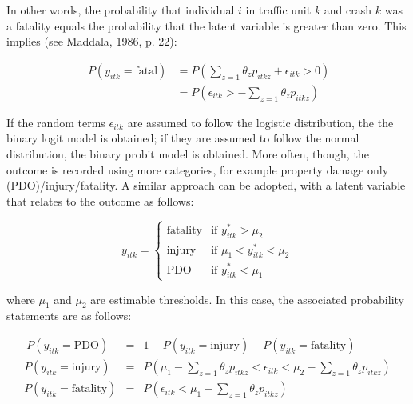 \documentclass[]{elsarticle} %
\begin{document}
In other words, the probability that individual \(i\) in traffic unit
\(k\) and crash \(k\) was a fatality equals the probability that the
latent variable is greater than zero. This implies (see Maddala, 1986,
p. 22):

\begin{equation}
\label{eq:probability-2-outcomes-2}
\begin{array}{rl}\
P(y_{itk} = \text{fatal}) &= P(\sum_{z=1}\theta_zp_{itkz} + \epsilon_{itk} > 0)\\ 
&=P(\epsilon_{itk} > -\sum_{z=1}\theta_zp_{itkz})
\end{array}
\end{equation}

If the random terms \(\epsilon_{itk}\) are assumed to follow the
logistic distribution, the the binary logit model is obtained; if they
are assumed to follow the normal distribution, the binary probit model
is obtained. More often, though, the outcome is recorded using more
categories, for example property damage only (PDO)/injury/fatality. A
similar approach can be adopted, with a latent variable that relates to
the outcome as follows:

\begin{equation}
\label{eq:latent-function-ordered-outcomes}
y_{itk} = 
\begin{cases}
\text{fatality} & \text{if } y_{itk}^*> \mu_2\\
\text{injury} & \text{if } \mu_1< y_{itk}^*< \mu_2\\
\text{PDO} & \text{if } y_{itk}^*< \mu_1
\end{cases}
\end{equation}

\noindent where \(\mu_1\) and \(\mu_2\) are estimable thresholds. In
this case, the associated probability statements are as follows:

\begin{equation}
\label{eq:probability-ordered-outcomes}
\begin{array}{rcl}\
P(y_{itk} = \text{PDO}) &=& 1 - P(y_{itk} = \text{injury}) - P(y_{itk} = \text{fatality})\\ 
P(y_{itk} = \text{injury}) &=& P(\mu_1 - \sum_{z=1}\theta_zp_{itkz} < \epsilon_{itk} < \mu_2 - \sum_{z=1}\theta_zp_{itkz})\\
P(y_{itk} = \text{fatality}) &=& P(\epsilon_{itk} < \mu_1 - \sum_{z=1}\theta_zp_{itkz})
\end{array}
\end{equation}
\end{document}
